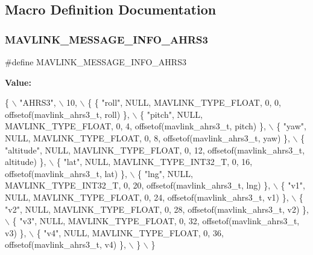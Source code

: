 \subsection{Macro Definition Documentation}
\mbox{\label{mavlink__msg__ahrs3_8h_a761be0e122b530d67d2b8e2b04aaa37b}} 
\subsubsection{M\+A\+V\+L\+I\+N\+K\+\_\+\+M\+E\+S\+S\+A\+G\+E\+\_\+\+I\+N\+F\+O\+\_\+\+A\+H\+R\+S3}
{\footnotesize\ttfamily \#define M\+A\+V\+L\+I\+N\+K\+\_\+\+M\+E\+S\+S\+A\+G\+E\+\_\+\+I\+N\+F\+O\+\_\+\+A\+H\+R\+S3}

{\bfseries Value\+:}
\begin{DoxyCode}
\{ \(\backslash\)
    \textcolor{stringliteral}{"AHRS3"}, \(\backslash\)
    10, \(\backslash\)
    \{  \{ \textcolor{stringliteral}{"roll"}, NULL, MAVLINK_TYPE_FLOAT, 0, 0, offsetof(mavlink_ahrs3_t, roll) \}, \(\backslash\)
         \{ \textcolor{stringliteral}{"pitch"}, NULL, MAVLINK_TYPE_FLOAT, 0, 4, offsetof(mavlink_ahrs3_t, pitch) \}, \(\backslash\)
         \{ \textcolor{stringliteral}{"yaw"}, NULL, MAVLINK_TYPE_FLOAT, 0, 8, offsetof(mavlink_ahrs3_t, yaw) \}, \(\backslash\)
         \{ \textcolor{stringliteral}{"altitude"}, NULL, MAVLINK_TYPE_FLOAT, 0, 12, offsetof(mavlink_ahrs3_t, altitude) \}, \(\backslash\)
         \{ \textcolor{stringliteral}{"lat"}, NULL, MAVLINK_TYPE_INT32_T, 0, 16, offsetof(mavlink_ahrs3_t, lat) \}, \(\backslash\)
         \{ \textcolor{stringliteral}{"lng"}, NULL, MAVLINK_TYPE_INT32_T, 0, 20, offsetof(mavlink_ahrs3_t, lng) \}, \(\backslash\)
         \{ \textcolor{stringliteral}{"v1"}, NULL, MAVLINK_TYPE_FLOAT, 0, 24, offsetof(mavlink_ahrs3_t, v1) \}, \(\backslash\)
         \{ \textcolor{stringliteral}{"v2"}, NULL, MAVLINK_TYPE_FLOAT, 0, 28, offsetof(mavlink_ahrs3_t, v2) \}, \(\backslash\)
         \{ \textcolor{stringliteral}{"v3"}, NULL, MAVLINK_TYPE_FLOAT, 0, 32, offsetof(mavlink_ahrs3_t, v3) \}, \(\backslash\)
         \{ \textcolor{stringliteral}{"v4"}, NULL, MAVLINK_TYPE_FLOAT, 0, 36, offsetof(mavlink_ahrs3_t, v4) \}, \(\backslash\)
         \} \(\backslash\)
\}
\end{DoxyCode}
\mbox{\label{mavlink__msg__ahrs3_8h_a697ea2c6889dca391fee17eb52dd4ad4}} 
